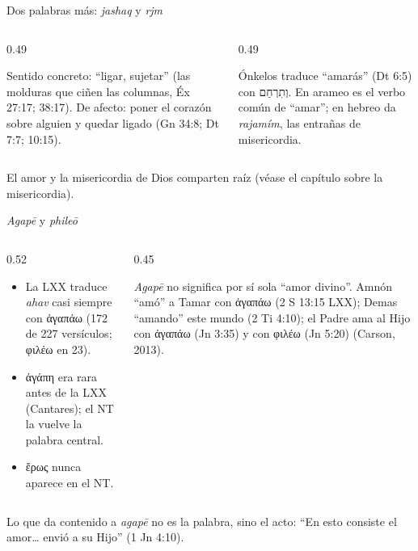 \documentclass[hyperref={bookmarks=false},aspectratio=169]{beamer}
\newcommand{\heb}[1]{\mbox{\foreignlanguage{hebrew}{#1}}}
\newcommand{\grc}[1]{\foreignlanguage{ancientgreek}{#1}}
\begin{document}
\begin{frame}{Dos palabras más: \emph{jashaq} y \emph{rjm}}
\begin{columns}[t,onlytextwidth]
\begin{column}{0.49\textwidth}
\begin{tcolorbox}[colback=papiro,colframe=azul,boxrule=0.8pt,arc=3pt,title={\heb{חָשַׁק} \emph{jashaq}},coltitle=papiro,colbacktitle=azul,fonttitle=\small\bfseries]
\small Sentido concreto: ``ligar, sujetar'' (las molduras que ciñen las columnas, Éx 27:17; 38:17). De afecto: poner el corazón sobre alguien y quedar ligado (Gn 34:8; Dt 7:7; 10:15).
\end{tcolorbox}
\end{column}
\begin{column}{0.49\textwidth}
\begin{tcolorbox}[colback=papiro,colframe=azul,boxrule=0.8pt,arc=3pt,title={\heb{רחם} \emph{rjm}},coltitle=papiro,colbacktitle=azul,fonttitle=\small\bfseries]
\small Ónkelos traduce ``amarás'' (Dt 6:5) con \heb{וְתִרְחַם}. En arameo es el verbo común de ``amar''; en hebreo da \emph{rajamím}, las entrañas de misericordia.
\end{tcolorbox}
\end{column}
\end{columns}\medskip
\small El amor y la misericordia de Dios comparten raíz (véase el capítulo sobre la misericordia).
\end{frame}

\begin{frame}{\emph{Agapē} y \emph{phileō}}
\begin{columns}[c,onlytextwidth]
\begin{column}{0.52\textwidth}\small
\begin{itemize}
\item La LXX traduce \emph{ahav} casi siempre con \grc{ἀγαπάω} (172 de 227 versículos; \grc{φιλέω} en 23).
\item \grc{ἀγάπη} era rara antes de la LXX (Cantares); el NT la vuelve la palabra central.
\item \grc{ἔρως} nunca aparece en el NT.
\end{itemize}
\end{column}
\begin{column}{0.45\textwidth}
\begin{tcolorbox}[colback=dorado!10,colframe=dorado!85!azul,boxrule=0.6pt,arc=2pt,title={Falacia de la raíz},fonttitle=\scriptsize\bfseries,coltitle=azuloscuro,colbacktitle=dorado!30]
\scriptsize \emph{Agapē} no significa por sí sola ``amor divino''. Amnón ``amó'' a Tamar con \grc{ἀγαπάω} (2 S 13:15 LXX); Demas ``amando'' este mundo (2 Ti 4:10); el Padre ama al Hijo con \grc{ἀγαπάω} (Jn 3:35) y con \grc{φιλέω} (Jn 5:20) (Carson, 2013).
\end{tcolorbox}
\end{column}
\end{columns}\medskip
\small Lo que da contenido a \emph{agapē} no es la palabra, sino el acto: ``En esto consiste el amor\ldots{} envió a su Hijo'' (1 Jn 4:10).
\end{frame}
\end{document}
